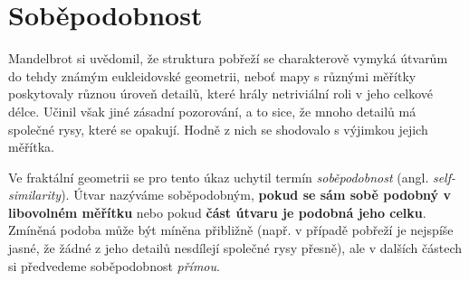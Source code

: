 \section{Soběpodobnost}\label{sec:sobepodobnost}
Mandelbrot si uvědomil, že struktura pobřeží se charakterově vymyká útvarům do tehdy známým eukleidovské geometrii, neboť mapy s různými měřítky poskytovaly různou úroveň detailů, které hrály netriviální roli v jeho celkové délce. Učinil však jiné zásadní pozorování, a to sice, že mnoho detailů má společné rysy, které se opakují. Hodně z nich se shodovalo s výjimkou jejich měřítka. \citep[str. 96]{Mandelbrot1983}\par

Ve fraktální geometrii se pro tento úkaz uchytil termín \emph{soběpodobnost} (angl. \emph{self-similarity}). Útvar nazýváme soběpodobným, \textbf{pokud se sám sobě podobný v libovolném měřítku} \citep[str. 220]{Voracova2022} nebo pokud \textbf{část útvaru je podobná jeho celku}. Zmíněná podoba může být míněna přibližně (např. v případě pobřeží je nejspíše jasné, že žádné z jeho detailů nesdílejí společné rysy přesně), ale v dalších částech si předvedeme soběpodobnost \emph{přímou}.

